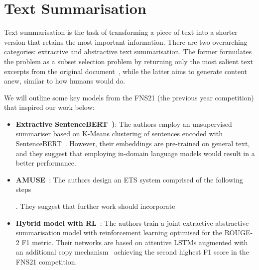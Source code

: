 \section{Text Summarisation}\label{sec:text-summarisation}
Text summarisation is the task of transforming a piece of text into a shorter  version that retains the most important information.
There are two overarching categories: extractive and abstractive text summarisation.
The former formulates the problem as a subset selection problem by returning only the most salient text excerpts from the original document~\cite{zhong-etal-2020-extractive}, while the latter aims to generate content anew, similar to how humans would do.

We will outline some key models from the FNS21 (the previous year competition) that inspired our work below:
\begin{itemize}
    \item \textbf{Extractive SentenceBERT~\cite{gokhan-etal-2021-extractive})}: The authors employ an unsupervised summariser based on K-Means clustering of sentences encoded with SentenceBERT~\cite{reimers2019sentence}.
    However, their embeddings are pre-trained on general text, and they suggest that employing in-domain language models would result in a better performance.

    \item \textbf{AMUSE}~\cite{litvak-vanetik-2021-summarization}: The authors design an ETS system comprised of the following steps .
    They suggest that further work should incorporate 

    \item \textbf{Hybrid model with RL}~\cite{zmandar-etal-2021-joint}: The authors train a joint extractive-abstractive summarisation model with reinforcement learning optimised for the ROUGE-2 F1 metric.
    Their networks are based on attentive LSTMs augmented with an additional copy mechanism~\cite{vinyals2015pointer} achieving the second highest F1 score in the FNS21 competition.


\end{itemize}
